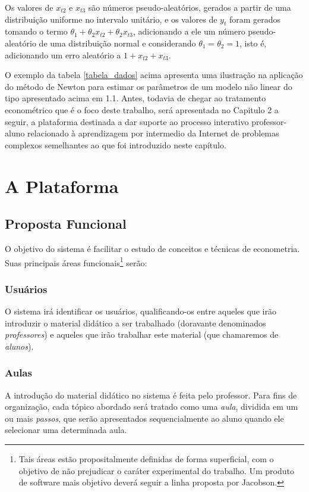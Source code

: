 \documentclass{abnt}
\begin{document}
	Os valores de $x_{t2}$ e $x_{t3}$ são números pseudo-aleatórios, gerados a partir de uma distribuição uniforme no intervalo unitário, e os valores de $y_t$ foram gerados tomando o termo $\theta_1 + \theta_2x_{t2}+\theta_2x_{t3}$, adicionando a ele um número pseudo-aleatório de uma distribuição normal e considerando $\theta_1 = \theta_2 = 1$, isto é, adicionando um erro aleatório a $1+x_{t2}+x_{t3}$.







	O exemplo da tabela \ref{tabela_dados} acima apresenta uma ilustração na aplicação do método de Newton para estimar os parâmetros de um modelo não linear do tipo apresentado acima em 1.1. Antes, todavia de chegar ao tratamento econométrico que é o foco deste trabalho, será apresentada no Capitulo 2 a seguir, a plataforma destinada a dar suporte ao processo interativo professor-aluno relacionado à aprendizagem por intermedio da Internet de problemas complexos semelhantes ao que foi introduzido neste capítulo.



\chapter {A Plataforma}

\section{Proposta Funcional}


	O objetivo do sistema é facilitar o estudo de conceitos e técnicas de econometria. Suas principais áreas funcionais\footnote{Tais áreas estão propositalmente definidas de forma superficial, com o objetivo de não prejudicar o caráter experimental do trabalho. Um produto de software mais objetivo deverá seguir a linha proposta por Jacobson\cite{Jacobson}.} serão:

\subsection{Usuários}


	O sistema irá identificar os usuários, qualificando-os entre aqueles que irão introduzir o material didático a ser trabalhado (doravante denominados \textit{professores}) e aqueles que irão trabalhar este material (que chamaremos de \textit{alunos}).
\subsection{Aulas}
	A introdução do material didático no sistema é feita pelo professor. Para fins de organização, cada tópico abordado será tratado como uma \textit{aula}, dividida em um ou mais \textit{passos}, que serão apresentados sequencialmente ao aluno quando ele selecionar uma determinada aula.
\end{document}
